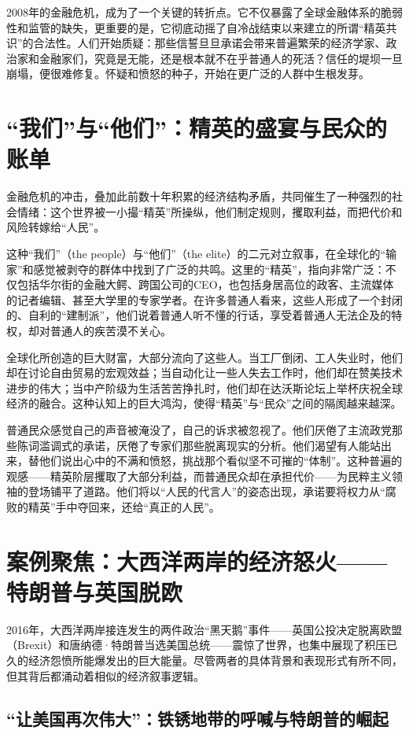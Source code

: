 2008年的金融危机，成为了一个关键的转折点。它不仅暴露了全球金融体系的脆弱性和监管的缺失，更重要的是，它彻底动摇了自冷战结束以来建立的所谓“精英共识”的合法性。人们开始质疑：那些信誓旦旦承诺会带来普遍繁荣的经济学家、政治家和金融家们，究竟是无能，还是根本就不在乎普通人的死活？信任的堤坝一旦崩塌，便很难修复。怀疑和愤怒的种子，开始在更广泛的人群中生根发芽。

\section{“我们”与“他们”：精英的盛宴与民众的账单}

金融危机的冲击，叠加此前数十年积累的经济结构矛盾，共同催生了一种强烈的社会情绪：这个世界被一小撮“精英”所操纵，他们制定规则，攫取利益，而把代价和风险转嫁给“人民”。

这种“我们”（the people）与“他们”（the elite）的二元对立叙事，在全球化的“输家”和感觉被剥夺的群体中找到了广泛的共鸣。这里的“精英”，指向非常广泛：不仅包括华尔街的金融大鳄、跨国公司的CEO，也包括身居高位的政客、主流媒体的记者编辑、甚至大学里的专家学者。在许多普通人看来，这些人形成了一个封闭的、自利的“建制派”，他们说着普通人听不懂的行话，享受着普通人无法企及的特权，却对普通人的疾苦漠不关心。

全球化所创造的巨大财富，大部分流向了这些人。当工厂倒闭、工人失业时，他们却在讨论自由贸易的宏观效益；当自动化让一些人失去工作时，他们却在赞美技术进步的伟大；当中产阶级为生活苦苦挣扎时，他们却在达沃斯论坛上举杯庆祝全球经济的融合。这种认知上的巨大鸿沟，使得“精英”与“民众”之间的隔阂越来越深。

普通民众感觉自己的声音被淹没了，自己的诉求被忽视了。他们厌倦了主流政党那些陈词滥调式的承诺，厌倦了专家们那些脱离现实的分析。他们渴望有人能站出来，替他们说出心中的不满和愤怒，挑战那个看似坚不可摧的“体制”。这种普遍的观感——精英阶层攫取了大部分利益，而普通民众却在承担代价——为民粹主义领袖的登场铺平了道路。他们将以“人民的代言人”的姿态出现，承诺要将权力从“腐败的精英”手中夺回来，还给“真正的人民”。

\section{案例聚焦：大西洋两岸的经济怒火——特朗普与英国脱欧}

2016年，大西洋两岸接连发生的两件政治“黑天鹅”事件——英国公投决定脱离欧盟（Brexit）和唐纳德·特朗普当选美国总统——震惊了世界，也集中展现了积压已久的经济怨愤所能爆发出的巨大能量。尽管两者的具体背景和表现形式有所不同，但其背后都涌动着相似的经济叙事逻辑。

\subsection{“让美国再次伟大”：铁锈地带的呼喊与特朗普的崛起}

